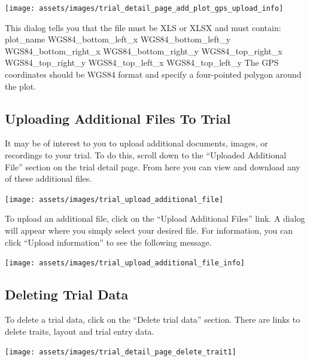 \documentclass[
  12pt,
]{book}
\begin{document}
\begin{center}\texttt{[image: assets/images/trial\_detail\_page\_add\_plot\_gps\_upload\_info]} \end{center}

This dialog tells you that the file must be XLS or XLSX and must contain: plot\_name WGS84\_bottom\_left\_x WGS84\_bottom\_left\_y WGS84\_bottom\_right\_x WGS84\_bottom\_right\_y WGS84\_top\_right\_x WGS84\_top\_right\_y WGS84\_top\_left\_x WGS84\_top\_left\_y The GPS coordinates should be WGS84 format and specify a four-pointed polygon around the plot.

\hypertarget{uploading-additional-files-to-trial}{%
\subsection{Uploading Additional Files To Trial}\label{uploading-additional-files-to-trial}}

It may be of interest to you to upload additional documents, images, or recordings to your trial. To do this, scroll down to the ``Uploaded Additional File'' section on the trial detail page. From here you can view and download any of these additional files.

\begin{center}\texttt{[image: assets/images/trial\_upload\_additional\_file]} \end{center}

To upload an additional file, click on the ``Upload Additional Files'' link. A dialog will appear where you simply select your desired file. For information, you can click ``Upload information'' to see the following message.

\begin{center}\texttt{[image: assets/images/trial\_upload\_additional\_file\_info]} \end{center}

\hypertarget{deleting-trial-data}{%
\subsection{Deleting Trial Data}\label{deleting-trial-data}}

To delete a trial data, click on the ``Delete trial data'' section. There are links to delete traits, layout and trial entry data.

\begin{center}\texttt{[image: assets/images/trial\_detail\_page\_delete\_trait1]} \end{center}
\end{document}
